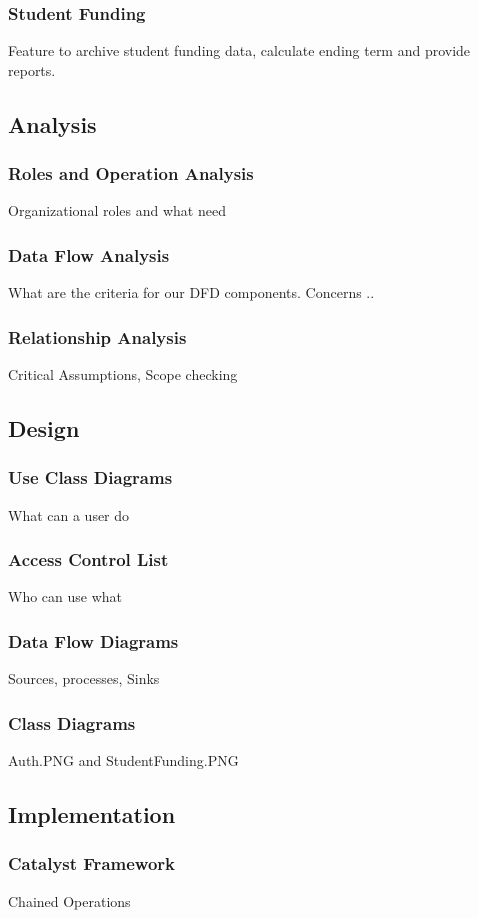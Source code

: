 \documentclass{journal}
\begin{document}
	\subsubsection{Student Funding}
	Feature to archive student funding data, calculate ending term and provide reports.
	\subsection{Analysis}
	\subsubsection{Roles and Operation Analysis}
	Organizational roles and what need 
	\subsubsection{Data Flow Analysis}
	What are the criteria for our DFD components. Concerns .. 
	\subsubsection{Relationship Analysis}
	Critical Assumptions, Scope checking
	\subsection{Design}
	\subsubsection{Use Class Diagrams}
	What can a user do
	\subsubsection{Access Control List}
	Who can use what
	\subsubsection{Data Flow Diagrams}
	Sources, processes, Sinks
	\subsubsection{Class Diagrams}
	Auth.PNG and StudentFunding.PNG
	\subsection{Implementation}
	\subsubsection{Catalyst Framework}
	Chained Operations
\end{document}
